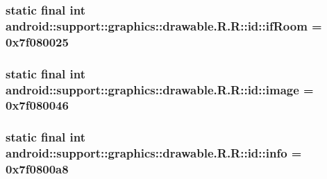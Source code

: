 \hypertarget{classandroid_1_1support_1_1graphics_1_1drawable_1_1_r_1_1id_15c2a60da8e00d2d9821d899b5c8d089}{
\subsubsection[{ifRoom}]{\setlength{\rightskip}{0pt plus 5cm}static final int android::support::graphics::drawable.R.R::id::ifRoom = 0x7f080025}}
\label{classandroid_1_1support_1_1graphics_1_1drawable_1_1_r_1_1id_15c2a60da8e00d2d9821d899b5c8d089}


\hypertarget{classandroid_1_1support_1_1graphics_1_1drawable_1_1_r_1_1id_70577654f53b33304ce8067bcbbb50ac}{
\subsubsection[{image}]{\setlength{\rightskip}{0pt plus 5cm}static final int android::support::graphics::drawable.R.R::id::image = 0x7f080046}}
\label{classandroid_1_1support_1_1graphics_1_1drawable_1_1_r_1_1id_70577654f53b33304ce8067bcbbb50ac}


\hypertarget{classandroid_1_1support_1_1graphics_1_1drawable_1_1_r_1_1id_84272180a30f4d65a294373ee1a537d8}{
\subsubsection[{info}]{\setlength{\rightskip}{0pt plus 5cm}static final int android::support::graphics::drawable.R.R::id::info = 0x7f0800a8}}
\label{classandroid_1_1support_1_1graphics_1_1drawable_1_1_r_1_1id_84272180a30f4d65a294373ee1a537d8}


